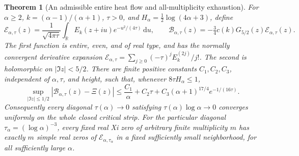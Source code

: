 \documentclass[11pt]{article}
\newtheorem{theorem}{Theorem}
\theoremstyle{remark}\newtheorem{remark}[theorem]{Remark}
\newcommand{\R}{\mathbb R}
\newcommand{\dd}{\,\mathrm d}
\begin{document}
\begin{theorem}[An admissible entire heat flow and all-multiplicity exhaustion]
\label{thm:mehler-heated-exhaustion}
For $\alpha\ge2$, $k=(\alpha-1)/(\alpha+1)$, $\tau>0$, and
$H_\alpha=\tfrac12\log(4\alpha+3)$, define
\[
 \mathcal E_{\alpha,\tau}(z)=\frac1{\sqrt{4\pi\tau}}
       \int_\R E_k(z+iu)e^{-u^2/(4\tau)}\dd u,\qquad
 \mathcal B_{\alpha,\tau}(z)
       =-\tfrac34c(k)G_{5/2}(z)\mathcal E_{\alpha,\tau}(z).
 \tag{MHeat}
\]
The first function is entire, even, and of real type, and has the
normally convergent derivative expansion
$\mathcal E_{\alpha,\tau}=\sum_{j\ge0}(-\tau)^jE_k^{(2j)}/j!$.
The second is holomorphic on $|\Im z|<5/2$. There are finite positive
constants $C_1,C_2,C_3$, independent of $\alpha,\tau$, and height,
such that, whenever $8\tau H_\alpha\le1$,
\[
 \sup_{|\Im z|\le1/2}|\mathcal B_{\alpha,\tau}(z)-\Xi(z)|
 \le \frac{C_1}{\alpha}+C_2\tau+
                   C_3(\alpha+1)^{17/4}e^{-1/(16\tau)}. \tag{MHU}
\]
Consequently every diagonal $\tau(\alpha)\to0$ satisfying
$\tau(\alpha)\log\alpha\to0$ converges uniformly on the whole closed
critical strip. For the particular diagonal
$\tau_\alpha=(\log\alpha)^{-3}$, every fixed real Xi zero of arbitrary
finite multiplicity $m$ has exactly $m$ simple real zeros of
$\mathcal E_{\alpha,\tau_\alpha}$ in a fixed sufficiently small
neighborhood, for all sufficiently large $\alpha$.
\end{theorem}
\end{document}
